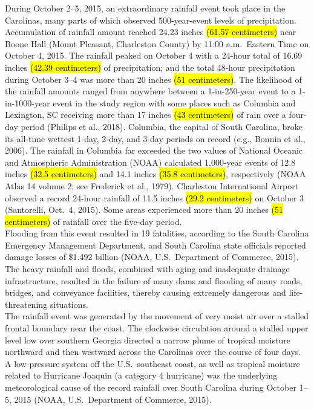 
During October 2--5, 2015, an extraordinary rainfall event took place in the Carolinas, many parts of which observed 500-year-event levels of precipitation.
Accumulation of rainfall amount reached 24.23 inches \hl{(61.57 centimeters)} near Boone Hall (Mount Pleasant, Charleston County) by 11:00 a.m.\ Eastern Time on October 4, 2015.
The rainfall peaked on October 4 with a 24-hour total of 16.69 inches \hl{(42.39 centimeters)} of precipitation;
and the total 48-hour precipitation during October 3--4 was more than 20 inches \hl{(51 centimeters)}.
The likelihood of the rainfall amounts ranged from anywhere between a 1-in-250-year event to a 1-in-1000-year event in the study region with some places such as Columbia and Lexington, SC receiving more than 17 inches \hl{(43 centimeters)} of rain over a four-day period (Philips et al., 2018).
Columbia, the capital of South Carolina, broke its all-time wettest 1-day, 2-day, and 3-day periods on record (e.g., Bonnin et al., 2006).
The rainfall in Columbia far exceeded the two values of National Oceanic and Atmospheric Administration (NOAA) calculated 1,000-year events of 12.8 inches \hl{(32.5 centimeters)} and 14.1 inches \hl{(35.8 centimeters)}, respectively (NOAA Atlas 14 volume 2;
see Frederick et al., 1979).
Charleston International Airport observed a record 24-hour rainfall of 11.5 inches \hl{(29.2 centimeters)} on October 3 (Santorelli, Oct.\ 4, 2015).
Some areas experienced more than 20 inches \hl{(51 centimeters)} of rainfall over the five-day period. \\

Flooding from this event resulted in 19 fatalities, according to the South Carolina Emergency Management Department, and South Carolina state officials reported damage losses of \$1.492 billion (NOAA, U.S.\ Department of Commerce, 2015).
The heavy rainfall and floods, combined with aging and inadequate drainage infrastructure, resulted in the failure of many dams and flooding of many roads, bridges, and conveyance facilities, thereby causing extremely dangerous and life-threatening situations. \\

The rainfall event was generated by the movement of very moist air over a stalled frontal boundary near the coast.
The clockwise circulation around a stalled upper level low over southern Georgia directed a narrow plume of tropical moisture northward and then westward across the Carolinas over the course of four days.
A low-pressure system off the U.S.\ southeast coast,  as well as tropical moisture related to Hurricane Joaquin (a category 4 hurricane) was the underlying meteorological cause of the record rainfall over South Carolina during October 1--5, 2015 (NOAA, U.S.\ Department of Commerce, 2015). \\


